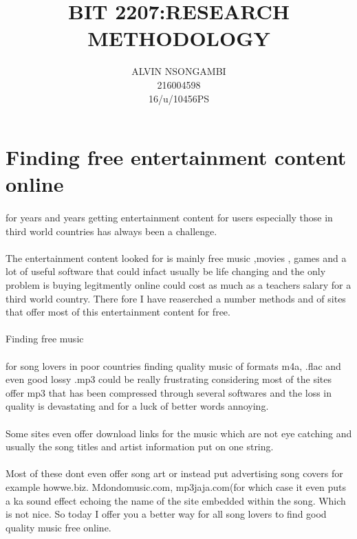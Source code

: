 \documentclass[11pt]{article}
\title{BIT 2207:RESEARCH METHODOLOGY}
\author{ALVIN NSONGAMBI\\216004598\\16/u/10456PS}
\begin{document}
	\maketitle
	\section{Finding free entertainment content online}
	\paragraph{}
	for years and years getting entertainment content for users especially those in third world countries has always been a challenge.
	\paragraph{}
	The entertainment content looked for is mainly free music ,movies , games and a lot of useful software that could infact usually be life changing
	and the only problem is buying legitmently online could cost as much as a teachers salary for a third world country.
	There fore I have reaserched a number methods and of sites that offer most of this entertainment content for free.
	\paragraph{}
	Finding free music
	\paragraph{}
	for song lovers in poor countries finding quality music of formats m4a, .flac and even good lossy .mp3 could be really frustrating considering most of the sites offer mp3 that has been compressed through several softwares and the loss in quality is devastating and for a luck of better words annoying.
	\paragraph{}
	Some sites even offer download links for the music which are not eye catching and usually the song titles and artist information put on one string.
	\paragraph{}
	Most of these dont even offer song art or instead put advertising song covers for example howwe.biz. Mdondomusic.com, mp3jaja.com(for which case it even puts a ka sound effect echoing the name of the site embedded within the song.
	Which is not nice.
	So today I offer you a better way for all song lovers to find good quality music free online.
\end{document}
